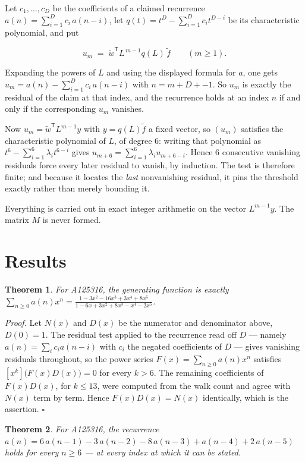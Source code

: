\documentclass[11pt]{article}
\newtheorem{theorem}{Theorem}
\theoremstyle{definition}
\begin{document}
Let $c_1,\dots,c_D$ be the coefficients of a claimed recurrence $a(n) = \sum_{i=1}^{D} c_i\,a(n-i)$, let $q(t) = t^{D} - \sum_{i=1}^{D} c_i t^{D-i}$ be its characteristic polynomial, and put

\[u_m \;=\; \tilde w^{\mathsf T} L^{\,m-1} q(L)\,\tilde f \qquad (m \ge 1).\]

Expanding the powers of $L$ and using the displayed formula for $a$, one gets $u_m = a(n) - \sum_{i=1}^{D} c_i\,a(n-i)$ with $n = m + D + -1$. So $u_m$ is exactly the residual of the claim at that index, and the recurrence holds at an index $n$ if and only if the corresponding $u_m$ vanishes.

Now $u_m = \tilde w^{\mathsf T} L^{m-1} y$ with $y = q(L)\tilde f$ a fixed vector, so $(u_m)$ satisfies the characteristic polynomial of $L$, of degree $6$: writing that polynomial as $t^{6} - \sum_{i=1}^{6} \lambda_i t^{6-i}$ gives $u_{m+6} = \sum_{i=1}^{6} \lambda_i u_{m+6-i}$. Hence $6$ consecutive vanishing residuals force every later residual to vanish, by induction. The test is therefore finite; and because it locates the {\itshape last} nonvanishing residual, it pins the threshold exactly rather than merely bounding it.

Everything is carried out in exact integer arithmetic on the vector $L^{m-1}y$. The matrix $M$ is never formed.

\section{Results}

\begin{theorem} For A125316, the generating function is exactly $\sum_{n\ge 0} a(n)x^n = \frac{1 - 3x^{2} - 16x^{3} + 3x^{4} + 8x^{5}}{1 - 6x + 3x^{2} + 8x^{3} - x^{4} - 2x^{5}}$.\end{theorem}

{\itshape Proof.} Let $N(x)$ and $D(x)$ be the numerator and denominator above, $D(0)=1$. The residual test applied to the recurrence read off $D$ --- namely $a(n) = \sum_i c_i a(n-i)$ with $c_i$ the negated coefficients of $D$ --- gives vanishing residuals throughout, so the power series $F(x)=\sum_{n\ge 0}a(n)x^n$ satisfies $[x^k]\bigl(F(x)D(x)\bigr) = 0$ for every $k > 6$. The remaining coefficients of $F(x)D(x)$, for $k \le 13$, were computed from the walk count and agree with $N(x)$ term by term. Hence $F(x)D(x) = N(x)$ identically, which is the assertion. $\square$

\begin{theorem} For A125316, the recurrence $a(n) = 6\,a(n-1) - 3\,a(n-2) - 8\,a(n-3) + a(n-4) + 2\,a(n-5)$ holds for every $n \ge 6$ --- at every index at which it can be stated.\end{theorem}
\end{document}
